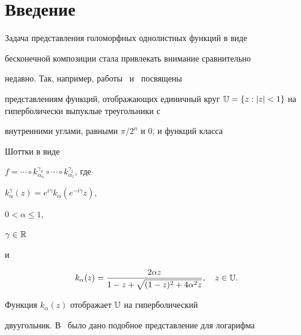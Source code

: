 \date{}




\pagestyle{plain} %







\maketitle


\label{begin}








\section*{Введение}





Задача представления голоморфных однолистных функций в виде


бесконечной композиции стала привлекать внимание сравнительно


недавно. Так, например, работы~\cite{PR} и~\cite{Pommer} посвящены


представлениям функций, отображающих единичный круг $\Bbb


U=\{z:|z|<1\}$ на гиперболически выпуклые треугольники с


внутренними углами, равными $\pi/{2^n}$ и $0$, и функций класса


Шоттки в виде


$f=\dotsb\circ k_{\alpha_n}^{\gamma_n}


\circ\dotsb\circ k_{\alpha_1}^{\gamma_1}$, где


$k_\alpha^\gamma(z)=e^{i\gamma}k_\alpha(e^{-i\gamma}z)$,


$0<\alpha\leqslant1$,


$\gamma\in\Bbb{R}$


и


$$


k_\alpha(z)=\frac{2\alpha


z}{1-z+\sqrt{(1-z)^2+4\alpha^2z}},\quad z\in\Bbb U.


$$


Функция $k_{\alpha}(z)$ отображает $\Bbb U$ на гиперболический 


двуугольник. В~\cite{Log} было дано подобное представление для логарифма 


